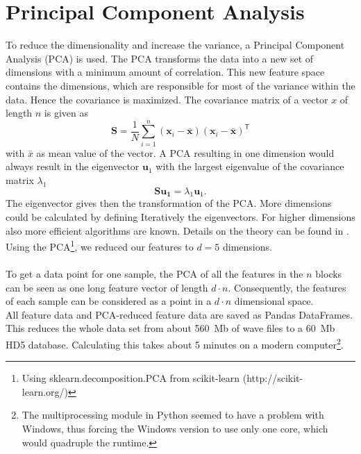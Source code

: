 \section{Principal Component Analysis}
To reduce the dimensionality and increase the variance, a Principal Component Analysis (PCA) is used. The PCA transforms the data into a new set of dimensions with a minimum amount of correlation. This new feature space contains the dimensions, which are responsible for most of the variance within the data. Hence the covariance is maximized. The covariance matrix of a vector $x$ of length $n$ is given as
\[
    \mathbf{S} = \frac{1}{N} \sum_{i=1}^{n}{(\mathbf{x}_i - \overline{\mathbf{x}}) (\mathbf{x}_i - \overline{\mathbf{x}})^\mathsf{T}}
\]
with $\overline{x}$ as mean value of the vector. A PCA resulting in one dimension would always result in the eigenvector $\mathbf{u}_1$ with the largest eigenvalue of the covariance matrix $\lambda_1$
\[
    \mathbf{S} \mathbf{u_1} = \lambda_1 \mathbf{u}_1.
\]
The eigenvector gives then the transformation of the PCA. More dimensions could be calculated by defining Iteratively the eigenvectors. For higher dimensions also more efficient algorithms are known. Details on the theory can be found in \cite[p.~561]{bib:Bishop2006}. Using the PCA\footnote{Using sklearn.decomposition.PCA from scikit-learn (http://scikit-learn.org/)}, we reduced our features to $d=5$ dimensions.\\\\
To get a data point for one sample, the PCA of all the features in the $n$ blocks can be seen as one long feature vector of length $d \cdot n$. Consequently, the features of each sample can be considered as a point in a $d \cdot n$ dimensional space.\\
All feature data and PCA-reduced feature data are saved as Pandas DataFrames. This reduces the whole data set from about 560~Mb of wave files to a 60~Mb HD5 database. Calculating this takes about 5 minutes on a modern computer\footnote{The multiprocessing module in Python seemed to have a problem with Windows, thus forcing the Windows version to use only one core, which would quadruple the runtime.}.
